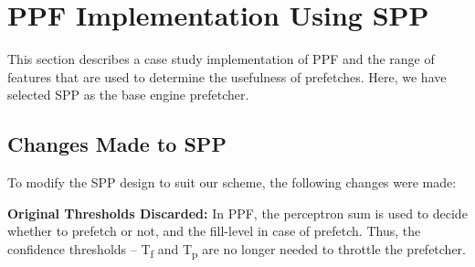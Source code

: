 \section{PPF Implementation Using SPP}
\label{Impl}

This section describes a case study implementation of PPF and the
range of features that are used to determine the usefulness of
prefetches.  Here, we have selected SPP as the base engine prefetcher.

\subsection{Changes Made to SPP}
\label{Impl-Changes}
To modify the SPP design to suit our scheme, the following changes
were made:

\noindent \textbf{Original Thresholds Discarded:} In PPF, the
perceptron sum is used to decide whether to prefetch or not, and the
fill-level in case of prefetch.  Thus, the confidence thresholds --
T\textsubscript{f} and T\textsubscript{p} are no longer needed to
throttle the prefetcher.  
%
%
%
%

